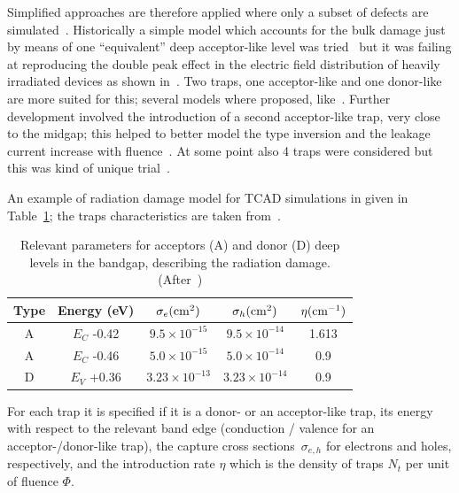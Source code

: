 Simplified approaches are therefore applied where only a subset of defects are simulated~\cite{Passeri1998,Passeri2001,Moscatelli-2002,bib:DP,Moscatelli-2004,Chiochia2005,CHIOCHIA2006,Moscatelli-2006,Pennicard:2008zz,dalal2014simulation,Passeri2015}. 
Historically a simple model which accounts for the bulk damage just by means of one ``equivalent'' 
deep acceptor-like level was tried~\cite{Passeri1998,Passeri2001} but it was failing at reproducing the 
double peak effect in the electric field distribution of heavily irradiated devices as shown in~\cite{Li1992}.
Two traps, one acceptor-like and one donor-like are more suited for this; several models where 
proposed, like~\cite{bib:DP,Chiochia2005,CHIOCHIA2006,dalal2014simulation}. 
Further development involved the introduction of a second acceptor-like trap, very close to the midgap; 
this helped to better model the type inversion and the leakage current increase with 
fluence~\cite{Moscatelli-2004,Moscatelli-2006,Pennicard:2008zz,Passeri2015}. At some point also 
4 traps were considered but this was kind of unique trial~\cite{Moscatelli-2002}.

An example of radiation damage model for TCAD simulations in given in Table~\ref{tab:raddammodelpars}; the traps characteristics are taken from~\cite{Pennicard:2008zz}.

\begin{table}[!htbp]
\centering
\caption{\label{tab:raddammodelpars}Relevant parameters for  acceptors (A) and donor (D) deep levels in the bandgap, describing the radiation damage. (After~\cite{Pennicard:2008zz})}
\begin{tabular}{ccccc}
  \hline
  Type & Energy (eV) & $\sigma_e (\rm{cm}^2)$ & $\sigma_h (\rm{cm}^2)$ & $\eta  (\rm{cm}^{-1})$ \\ 
  \hline
  \hline
  A &   $E_C $ -0.42 &  $9.5 \times10^{-15} $ &  $9.5 \times 10^{-14} $ & 1.613 \\
  A &   $E_C $ -0.46  &  $5.0 \times10^{-15} $ &  $5.0 \times 10^{-14} $ & 0.9 \\
  D &   $E_V $ +0.36  &  $3.23 \times10^{-13} $ &  $3.23 \times 10^{-14} $ & 0.9 \\
  \hline
\end{tabular}
\end{table}
For each trap it is specified if it is a donor- or an acceptor-like trap, its energy with respect to 
the relevant band edge (conduction / valence for an acceptor-/donor-like trap), the capture 
cross sections~$\sigma_{e,h}$ for electrons and holes, respectively, and the introduction rate $\eta$ 
which is the density of traps $N_t$ per unit of fluence $\Phi$.

